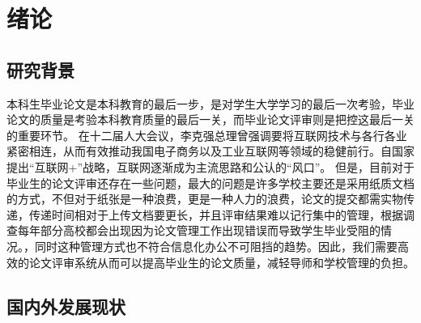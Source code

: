 
\chapter{绪论}
\label{chap02}
\section{研究背景}

本科生毕业论文是本科教育的最后一步，是对学生大学学习的最后一次考验，毕业论文的质量是考验本科教育质量的最后一关\cite{.2019}，而毕业论文评审则是把控这最后一关的重要环节。
在十二届人大会议，李克强总理曾强调要将互联网技术与各行各业紧密相连，从而有效推动我国电子商务以及工业互联网等领域的稳健前行\cite{.2020c}。自国家提出“互联网+”战略，互联网逐渐成为主流思路和公认的“风口”\cite{.20183}。 但是，目前对于毕业生的论文评审还存在一些问题，最大的问题是许多学校主要还是采用纸质文档的方式，不但对于纸张是一种浪费，更是一种人力的浪费，论文的提交都需实物传递，传递时间相对于上传文档要更长，并且评审结果难以记行集中的管理\cite{.2017e}，根据调查每年部分高校都会出现因为论文管理工作出现错误而导致学生毕业受阻的情况\cite{.2018}。，同时这种管理方式也不符合信息化办公不可阻挡的趋势。因此，我们需要高效的论文评审系统从而可以提高毕业生的论文质量，减轻导师和学校管理的负担\cite{.2019d}。


\section{国内外发展现状}

